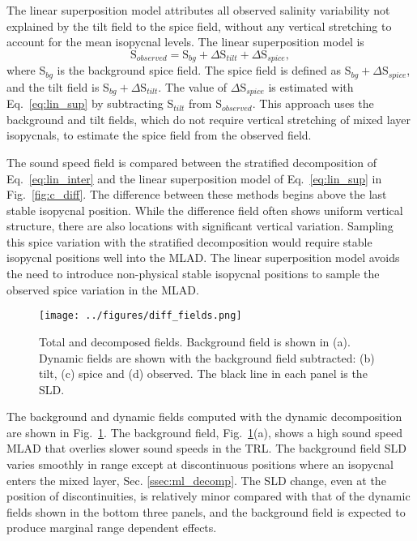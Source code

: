 \documentclass[preprint,NumberedRefs]{JASA}
\begin{document}
The linear superposition model attributes all observed salinity variability not explained by the tilt field to the spice field, without any vertical stretching to account for the mean isopycnal levels. The linear superposition model is
\begin{equation}
    \textrm{S}_{observed} = \textrm{S}_{bg} + \Delta \textrm{S}_{tilt} + \Delta \textrm{S}_{spice},
    \label{eq:lin_sup}
\end{equation}
where S$_{bg}$ is the background spice field. The spice field is defined as S$_{bg} + \Delta \textrm{S}_{spice}$, and the tilt field is S$_{bg} + \Delta \textrm{S}_{tilt}$. The value of $\Delta \textrm{S}_{spice}$ is estimated with Eq.~\eqref{eq:lin_sup} by subtracting S$_{tilt}$ from S$_{observed}$. This approach uses the background and tilt fields, which do not require vertical stretching of mixed layer isopycnals, to estimate the spice field from the observed field.

The sound speed field is compared between the stratified decomposition of Eq.~\eqref{eq:lin_inter} and the linear superposition model of Eq.~\eqref{eq:lin_sup} in Fig.~\ref{fig:c_diff}. The difference between these methods begins above the last stable isopycnal position. While the difference field often shows uniform vertical structure, there are also locations with significant vertical variation. Sampling this spice variation with the stratified decomposition would require stable isopycnal positions well into the MLAD. The linear superposition model avoids the need to introduce non-physical stable isopycnal positions to sample the observed spice variation in the MLAD.

\begin{figure}
\texttt{[image: ../figures/diff\_fields.png]}
        \caption{\label{fig:c_fields}{Total and decomposed fields. Background field is shown in (a). Dynamic fields are shown with the background field subtracted: (b) tilt, (c) spice and (d) observed. The black line in each panel is the SLD.}}
\end{figure}

The background and dynamic fields computed with the dynamic decomposition are shown in Fig.~\ref{fig:c_fields}. The background field, Fig.~\ref{fig:c_fields}(a), shows a high sound speed MLAD that overlies slower sound speeds in the TRL. The background field SLD varies smoothly in range except at discontinuous positions where an isopycnal enters the mixed layer, Sec. \ref{ssec:ml_decomp}. The SLD change, even at the position of discontinuities, is relatively minor compared with that of the dynamic fields shown in the bottom three panels, and the background field is expected to produce marginal range dependent effects.
\end{document}
